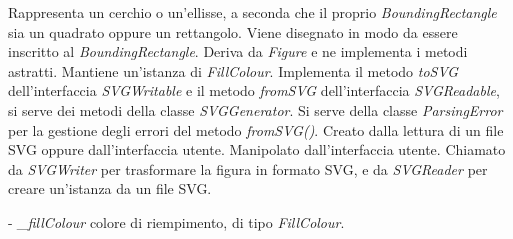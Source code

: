 Rappresenta un cerchio o un'ellisse, a seconda che il proprio \textit{BoundingRectangle} sia un quadrato oppure un rettangolo. Viene disegnato in modo da essere inscritto al \textit{BoundingRectangle}.
Deriva da \textit{Figure} e ne implementa i metodi astratti. Mantiene un'istanza di \textit{FillColour}. Implementa il metodo \textit{toSVG} dell'interfaccia \textit{SVGWritable} e il metodo \textit{fromSVG} dell'interfaccia \textit{SVGReadable}, si serve dei metodi della classe \textit{SVGGenerator}. Si serve della classe \textit{ParsingError} per la gestione degli errori del metodo \textit{fromSVG()}.
Creato dalla lettura di un file SVG oppure dall'interfaccia utente. Manipolato dall'interfaccia utente. Chiamato da \textit{SVGWriter} per trasformare la figura in formato SVG, e da \textit{SVGReader} per creare un'istanza da un file SVG.
\begin{elencopuntato}[\subsubsecindent]
\item[-] \textit{{\_}fillColour} colore di riempimento, di tipo \textit{FillColour}.
\end{elencopuntato}
